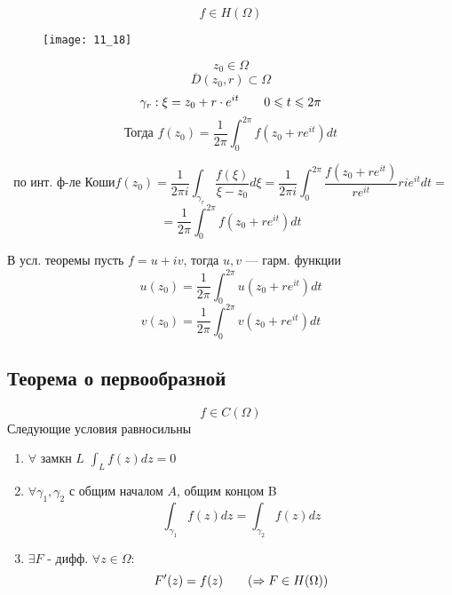\documentclass[main]{subfiles}
\begin{document}
    \begin{Theorem}
        \[f \in H(\Omega)\]
        \begin{figure}[H]
          \centering
          \texttt{[image: 11\_18]}
        \end{figure}
        \[z_0 \in \Omega\]
        \[\overline{D} (z_0, r) \subset \Omega \]
        \[\gamma_r : \xi = z_0 + r\cdot e^{it} \qquad 0 \leqslant t \leqslant 2\pi \]
        \[\text{Тогда } f(z_0) = \frac{1}{2\pi} \int_{0}^{2\pi} f(z_0 + re^{it} )dt  \]
    \end{Theorem}

    \begin{Proof}
        \[\text{по инт. ф-ле Коши} f(z_0) = \frac{1}{2\pi i} \int_{\gamma_r}
        \frac{f(\xi)}{\xi - z_0} d\xi = \frac{1}{2\pi i }\int_0^{2\pi} \frac{f(z_0 +
        r e^{it} )}{r e^{it} } r i e^{it} dt = \]
        \[= \frac{1}{2\pi}\int_0^{2\pi}  f(z_0 + re^{it} )dt\]
    \end{Proof}

    \begin{consequence}
        В усл. теоремы пусть $f = u + iv$, тогда $u, v$ --- гарм. функции
        \[u(z_0) = \frac{1}{2\pi} \int_0^{2\pi} u(z_0 + re^{it} )dt \]
        \[v(z_0) = \frac{1}{2\pi} \int_0^{2\pi} v(z_0 + re^{it} )dt\]
    \end{consequence}

    \newpage
    \subsection{Теорема о первообразной}

    \begin{Theorem}
        \[f \in C(\Omega)\]
        Следующие условия равносильны
        \begin{enumerate}
            \item $\forall $ замкн $L$ \qq $\displaystyle \int_L f(z)dz = 0$
            \item $\forall \gamma_1, \gamma_2$ с общим началом $A$, общим концом B
                \[\int_{\gamma_1} f(z)dz = \int_{\gamma_2} f(z)dz \]
            \item $\exists F$ - дифф. $\forall z \in \Omega:$
                \[F'(z) = f(z) \qquad (\Rightarrow F \in H(\Omega))\]
        \end{enumerate}
    \end{Theorem}
\end{document}
